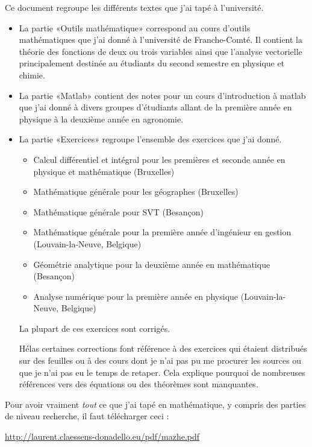 Ce document regroupe les différents textes que j'ai tapé à l'université.
\begin{itemize}
    \item La partie «Outils mathématique» correspond au cours d'outils mathématiques que j'ai donné à l'université de Franche-Comté. Il contient la théorie des fonctions de deux ou trois variables ainsi que l'analyse vectorielle principalement destinée au étudiants du second semestre en physique et chimie.
    \item La partie «Matlab» contient des notes pour un cours d'introduction à matlab que j'ai donné à divers groupes d'étudiants allant de la première année en physique à la deuxième année en agronomie.

    \item La partie «Exercices» regroupe l'ensemble des exercices que j'ai donné.

        \begin{itemize}
            \item Calcul différentiel et intégral pour les premières et seconde année en physique et mathématique (Bruxelles)
            \item Mathématique générale pour les géographes (Bruxelles)
            \item Mathématique générale pour SVT (Besançon)
            \item Mathématique générale pour la première année d'ingénieur en gestion (Louvain-la-Neuve, Belgique)
            \item Géométrie analytique pour la deuxième année en mathématique (Besançon)
            \item Analyse numérique pour la première année en physique (Louvain-la-Neuve, Belgique)
        \end{itemize}
        La plupart de ces exercices sont corrigés.

        Hélas certaines corrections font référence à des exercices qui étaient distribués sur des feuilles ou à des cours dont je n'ai pas pu me procurer les sources ou que je n'ai pas eu le temps de retaper. Cela explique pourquoi de nombreuses références vers des équations ou des théorèmes sont manquantes.
\end{itemize}

\vfill

Pour avoir vraiment \emph{tout} ce que j'ai tapé en mathématique, y compris des parties de niveau recherche, il faut télécharger ceci :
\begin{center}
    \url{http://laurent.claessens-donadello.eu/pdf/mazhe.pdf}
\end{center}



\clearpage

